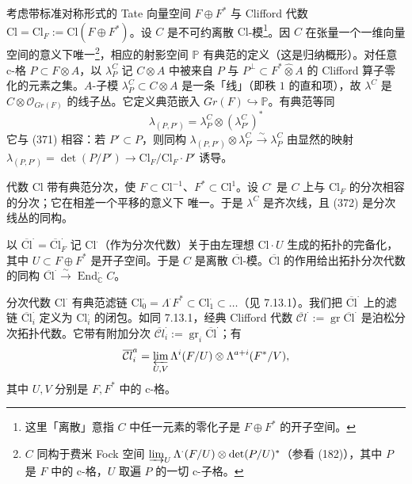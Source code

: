 考虑带标准对称形式的 Tate 向量空间 $F\oplus F^{*}$ 与 Clifford 代数 $\mathrm{Cl}=\mathrm{Cl}_F:=\mathrm{Cl}(F\oplus F^{*})$。设 $C$ 是不可约离散 $\mathrm{Cl}$-模\footnote{这里「离散」意指 $C$ 中任一元素的零化子是 $F\oplus F^{*}$ 的开子空间。}。因 $C$ 在张量一个一维向量空间的意义下唯一\footnote{$C$ 同构于费米 Fock 空间 $\varinjlim_U\Lambda^{\cdot}(F/U)\otimes\det(P/U)^{*}$（参看 (182)），其中 $P$ 是 $F$ 中的 c-格，$U$ 取遍 $P$ 的一切 c-子格。}，相应的射影空间 $\mathbb{P}$ 有典范的定义（这是归纳概形）。对任意 c-格 $P\subset F\widehat{\otimes}A$，以 $\lambda^{C}_P$ 记 $C\otimes A$ 中被来自 $P$ 与 $P^{\perp}\subset F^{*}\widehat{\otimes}A$ 的 Clifford 算子零化的元素之集。$A$-子模 $\lambda^{C}_P\subset C\otimes A$ 是一条「线」（即秩 $1$ 的直和项），故 $\lambda^{C}$ 是 $C\otimes\mathcal{O}_{Gr(F)}$ 的线子丛。它定义典范嵌入 $Gr(F)\hookrightarrow\mathbb{P}$。有典范等同
\begin{equation}\tag{372}
\lambda_{(P,P')}=\lambda^{C}_P\otimes(\lambda^{C}_{P'})^{*}
\end{equation}
它与 (371) 相容：若 $P'\subset P$，则同构 $\lambda_{(P,P')}\otimes\lambda^{C}_{P'}\xrightarrow{\sim}\lambda^{C}_P$ 由显然的映射 $\lambda_{(P,P')}=\det(P/P')\to\mathrm{Cl}_F/\mathrm{Cl}_F\cdot P'$ 诱导。

代数 $\mathrm{Cl}$ 带有典范分次，使 $F\subset\mathrm{Cl}^{-1}$、$F^{*}\subset\mathrm{Cl}^{1}$。设 $C^{\cdot}$ 是 $C$ 上与 $\mathrm{Cl}_F$ 的分次相容的分次；它在相差一个平移的意义下%
唯一。于是 $\lambda^{C}$ 是齐次线，且 (372) 是分次线丛的同构。

 以 $\overline{\mathrm{Cl}}^{\cdot}=\overline{\mathrm{Cl}}^{\cdot}_F$ 记 $\mathrm{Cl}^{\cdot}$（作为分次代数）关于由左理想 $\mathrm{Cl}\cdot U$ 生成的拓扑的完备化，其中 $U\subset F\oplus F^{*}$ 是开子空间。于是 $C$ 是离散 $\overline{\mathrm{Cl}}$-模。$\overline{\mathrm{Cl}}$ 的作用给出拓扑分次代数的同构 $\overline{\mathrm{Cl}}^{\cdot}\xrightarrow{\sim}\operatorname{End}^{\cdot}_{\mathbb{C}}C$。

分次代数 $\mathrm{Cl}^{\cdot}$ 有典范滤链 $\mathrm{Cl}^{\cdot}_0=\Lambda^{\cdot}F^{*}\subset\mathrm{Cl}^{\cdot}_1\subset\ldots$（见 7.13.1）。我们把 $\overline{\mathrm{Cl}}^{\cdot}$ 上的滤链 $\overline{\mathrm{Cl}}^{\cdot}_i$ 定义为 $\mathrm{Cl}^{\cdot}_i$ 的闭包。如同 7.13.1，经典 Clifford 代数 $\overline{\mathcal{C}l}^{\cdot}:=\operatorname{gr}\overline{\mathrm{Cl}}^{\cdot}$ 是泊松分次拓扑代数。它带有附加分次 $\overline{\mathcal{C}l}^{\cdot}_i:=\operatorname{gr}_i\overline{\mathrm{Cl}}^{\cdot}$；有
\[
\overline{\mathcal{C}l}^{a}_{i}=\varprojlim_{U,V}\Lambda^{i}(F/U)\otimes\Lambda^{a+i}(F^{*}/V),
\]
其中 $U,V$ 分别是 $F,F^{*}$ 中的 c-格。

